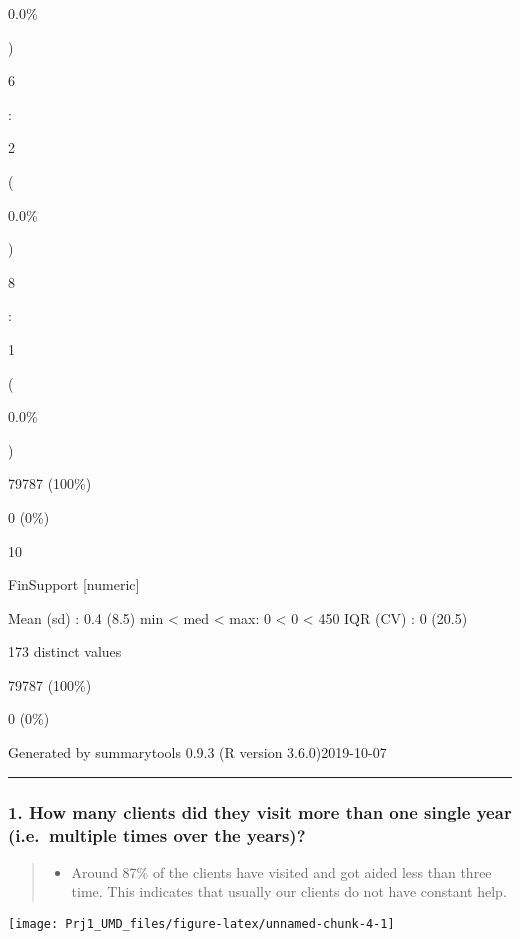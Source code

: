 \documentclass[]{article}
\providecommand{\tightlist}{%
  \setlength{\itemsep}{0pt}\setlength{\parskip}{0pt}}
\begin{document}
0.0\%

)

6

:

2

(

0.0\%

)

8

:

1

(

0.0\%

)

79787 (100\%)

0 (0\%)

10

FinSupport {[}numeric{]}

Mean (sd) : 0.4 (8.5) min \textless{} med \textless{} max: 0 \textless{}
0 \textless{} 450 IQR (CV) : 0 (20.5)

173 distinct values

79787 (100\%)

0 (0\%)

Generated by summarytools 0.9.3 (R version 3.6.0)2019-10-07

\begin{center}\rule{0.5\linewidth}{\linethickness}\end{center}

\hypertarget{how-many-clients-did-they-visit-more-than-one-single-year-i.e.multiple-times-over-the-years}{%
\subsubsection{1. How many clients did they visit more than one single
year (i.e.~multiple times over the
years)?}\label{how-many-clients-did-they-visit-more-than-one-single-year-i.e.multiple-times-over-the-years}}

\begin{quote}
\begin{itemize}
\tightlist
\item
  Around 87\% of the clients have visited and got aided less than three
  time. This indicates that usually our clients do not have constant
  help.
\end{itemize}
\end{quote}

\begin{center}\texttt{[image: Prj1\_UMD\_files/figure-latex/unnamed-chunk-4-1]} \end{center}
\end{document}
